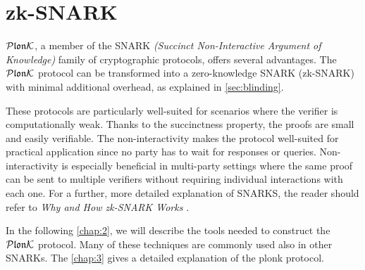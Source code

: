 \section{zk-SNARK}
$\mathcal{P}\mathfrak{lon}\mathcal{K}$, a member of the SNARK \textit{(Succinct Non-Interactive Argument of Knowledge)} family of cryptographic protocols, offers several advantages. The $\mathcal{P}\mathfrak{lon}\mathcal{K}$ protocol can be transformed into a zero-knowledge SNARK (zk-SNARK) with minimal additional overhead, as explained in \cref{sec:blinding}.

These protocols are particularly well-suited for scenarios where the verifier is computationally weak. Thanks to the succinctness property, the proofs are small and easily verifiable. The non-interactivity makes the protocol well-suited for practical application since no party has to wait for responses or queries. Non-interactivity is especially beneficial in multi-party settings where the same proof can be sent to multiple verifiers without requiring individual interactions with each one. For a further, more detailed explanation of SNARKS, the reader should refer to \textit{Why and How zk-SNARK Works} \cite{how-snark-works}.

In the following \cref{chap:2}, we will describe the tools needed to construct the $\mathcal{P}\mathfrak{lon}\mathcal{K}$ protocol. Many of these techniques are commonly used also in other SNARKs. The \cref{chap:3} gives a detailed explanation of the plonk protocol. 
